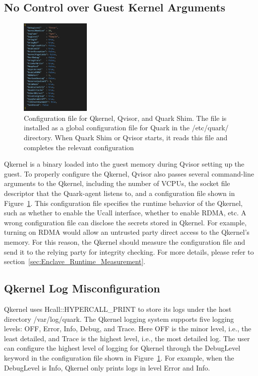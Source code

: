 \subsection{No Control over Guest Kernel Arguments}
\begin{figure}[htp]
  \centering
  \includegraphics[width=0.3\textwidth]{images/quark_config.PNG}
  \caption[Configuration file for Qkernel, Qvisor, and Quark Shim]{Configuration file for Qkernel, Qvisor, and Quark Shim. The file is installed as a global configuration file for Quark in the /etc/quark/ directory. When Quark Shim or Qvisor starts, it reads this file and completes the relevant configuration}
  \label{fig:quark_config}
\end{figure}

Qkernel is a binary loaded into the guest memory during Qvisor setting up the guest. To properly configure the Qkernel, Qvisor also passes several command-line arguments to the Qkernel, including the number of VCPUs, the socket file descriptor that the Quark-agent listens to, and a configuration 
file shown in Figure~\ref{fig:quark_config}. This configuration file specifies the runtime behavior of the Qkernel, such as whether to enable the Ucall interface, whether to enable RDMA, etc. A wrong configuration file can disclose the secrets stored in Qkernel. For example, turning on RDMA would allow an untrusted 
party direct access to the Qkernel’s memory. For this reason, the Qkernel should measure the configuration file and send it to the relying party for integrity checking. For more details, please refer to section~\ref{sec:Enclave_Runtime_Measurement}.

\subsection{Qkernel Log Misconfiguration}
\label{sec:Qkernel_Log_Misconfiguration}
Qkernel uses Hcall::HYPERCALL\_PRINT to store its logs under the host directory /var/log/quark. The Qkernel logging system supports five logging levels: OFF, Error, Info, Debug, and Trace. Here OFF is the minor level, i.e., the least detailed, and Trace is the highest level, i.e., the most detailed log. The user can configure the highest level of logging for 
Qkernel through the DebugLevel keyword in the configuration file shown in Figure~\ref{fig:quark_config}. For example, when the DebugLevel is Info, Qkernel only prints logs in level Error and Info. 

